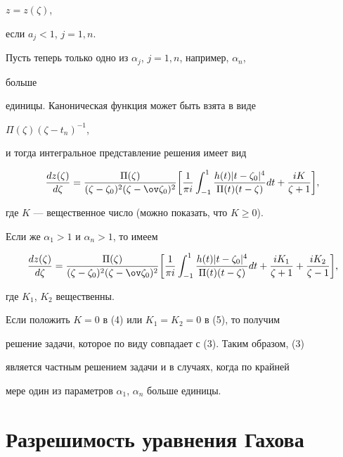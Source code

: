 $z=z(\zeta)$, 


если $a_j<1$, $j=1,n$. 


 


Пусть теперь только одно из $\alpha_j$, $j=1,n$, например, $\alpha_n$, 


больше 


единицы. Каноническая функция может быть взята в виде 


$\Pi(\zeta)(\zeta-t_n)^{-1}$, 


и тогда интегральное представление решения имеет вид 


\begin{equation} 


\frac{dz(\zeta)}{d\zeta}=\frac{\Pi(\zeta)} 


{(\zeta-\zeta_0)^2(\zeta-\ov\zeta_0)^2}\bigg[\frac{1}{\pi i} 


\int^1_{-1}\frac{h(t)|t-\zeta_0|^4}{\Pi(t)(t-\zeta)}dt+ 


\frac{i K}{\zeta+1}\bigg], 


\end{equation} 


где $K$ --- вещественное число (можно показать, что $K\ge0$). 


Если же $\alpha_1>1$ и $\alpha_n>1$, то имеем


\begin{equation} 


\frac{dz(\zeta)}{d\zeta}=\frac{\Pi(\zeta)} 


{(\zeta-\zeta_0)^2(\zeta-\ov\zeta_0)^2}\bigg[\frac{1}{\pi i} 


\int^1_{-1}\frac{h(t)|t-\zeta_0|^4}{\Pi(t)(t-\zeta)}dt+ 


\frac{i K_1}{\zeta+1}+\frac{i K_2}{\zeta-1}\bigg], 


\end{equation} 


где $K_1$, $K_2$ вещественны. 


Если положить $K=0$ в (4) или $K_1=K_2=0$ в (5), то получим 


решение задачи, которое по виду совпадает с (3). Таким образом, (3) 


является частным решением задачи и в случаях, когда по крайней 


мере один из параметров $\alpha_1$, $\alpha_n$ больше единицы. 


 


\section{Разрешимость уравнения Гахова} 


